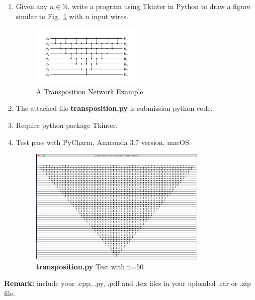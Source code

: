 \documentclass[12pt,a4paper]{article}
\makeatletter
\newtheorem*{solution}{Solution}
\theoremstyle{definition}
\renewenvironment{solution}[1][Solution] {\par\pushQED{\qed}\normalfont\topsep6\p@\@plus6\p@\relax\trivlist\item[\hskip\labelsep\bfseries#1\@addpunct{.}]\ignorespaces}{\popQED\endtrivlist\@endpefalse} \makeatother
\makeatother
\begin{document}
\begin{enumerate}
\begin{enumerate}
        \item
        {\color{red}{(Bonus)}} Given any $n \in \mathbb{N}$, write a program using Tkinter in Python to draw a figure similar to Fig.~\ref{Fig-Transposition} with $n$ input wires.
        \begin{figure}[htbp]
        \centering
        \includegraphics[width=0.5\textwidth]{figures/Fig-Transposition.pdf}
        \caption{A Transposition Network Example}\label{Fig-Transposition}
        \end{figure}
        \begin{solution}
        \renewcommand{\qedsymbol}{}
        {\color{blue}The attached file \textbf{transposition.py} is submission python code.}\item
        Require python package Tkinter.\item Test pass with PyCharm, Anaconda 3.7 version, macOS.
        \begin{figure}[htbp]
        \centering
        \includegraphics[width=0.8\textwidth]{figures/1_5.pdf}
        \caption{\textbf{transposition.py} Test with n=50}\label{Test}
        \end{figure}
        \end{solution}
    \end{enumerate}

\end{enumerate}

\vspace{20pt}

\textbf{Remark:} include your .cpp, .py, .pdf and .tex files in your uploaded .rar or .zip file.

\end{document}
